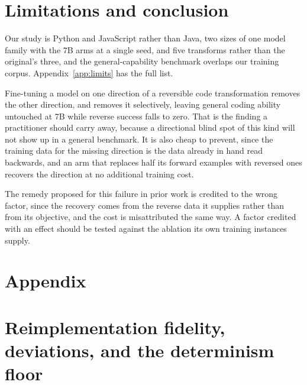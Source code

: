\documentclass{article}
\begin{document}
\section{Limitations and conclusion}
\label{sec:limits}

Our study is Python and JavaScript rather than Java, two sizes of one model family with the 7B
arms at a single seed, and five transforms rather than the original's three, and the
general-capability benchmark overlaps our training corpus. Appendix~\ref{app:limits} has the
full list.

Fine-tuning a model on one direction of a reversible code transformation removes the other
direction, and removes it selectively, leaving general coding ability untouched at 7B while
reverse success falls to zero. That is the finding a practitioner should carry away, because
a directional blind spot of this kind will not show up in a general benchmark. It is also
cheap to prevent, since the training data for the missing direction is the data already in
hand read backwards, and an arm that replaces half its forward examples with reversed ones
recovers the direction at no additional training cost.

The remedy proposed for this failure in prior work is credited to the wrong factor, since the
recovery comes from the reverse data it supplies rather than from its objective, and the cost is
misattributed the same way. A factor credited with an effect should be tested against the
ablation its own training instances supply.



\appendix
\section*{Appendix}

\section{Reimplementation fidelity, deviations, and the determinism floor}
\label{app:fidelity}
\end{document}
